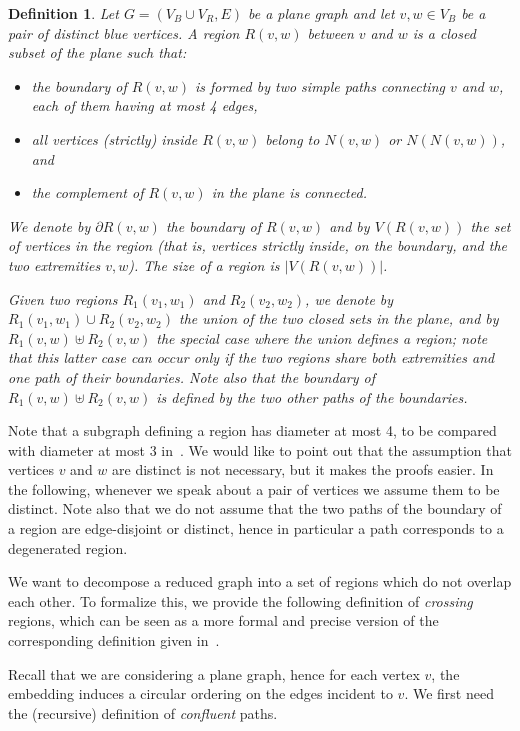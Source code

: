 \documentclass[a4paper,11pt]{article}
\newtheorem{defi} {Definition}
\begin{document}
\begin{defi}\label{def:region}
Let $G = (V_B \cup V_R,E) $ be a plane graph and let $v,w \in V_B$ be a pair of distinct blue vertices.
A \emph{region} $R(v,w)$ between $v$ and $w$ is a closed subset of the plane such that:
\begin{itemize}\itemsep0em
  \item the boundary of $R(v,w)$ is formed by two simple paths connecting $v$ and $w$, each of them having at most 4 edges,
  \item all vertices (strictly) inside $R(v,w)$ belong to $N(v,w)$ or $N(N(v,w))$, and
  \item the complement of $R(v,w)$ in the plane is connected.
\end{itemize}

We denote by $\partial R(v,w)$ the boundary of $R(v,w)$ and by $V(R(v,w))$ the set of vertices in the region (that is, vertices strictly inside, on the boundary, and the two extremities $v,w$). The \emph{size} of a region is $|V(R(v,w))|$.


Given two regions $R_1(v_1,w_1)$ and $R_2(v_2,w_2)$, we denote by $R_1(v_1,w_1) \cup R_2(v_2,w_2)$  the union of the two closed sets in the plane, and by $R_1(v,w) \uplus R_2(v,w)$ the special case where the union defines a region; note that this latter case can occur only if the two regions share both extremities and one path of their boundaries. Note also that the boundary of $R_1(v,w) \uplus R_2(v,w)$ is defined by the two other paths of the boundaries.
\end{defi}

Note that a subgraph defining a region has diameter at most 4, to be compared with diameter at most 3 in~\cite{AFN04}. We would like to point out that the assumption that vertices $v$ and $w$ are distinct is not necessary, but it makes the proofs easier. In the following, whenever we speak about a pair of vertices we assume them to be  distinct. Note also that we do not assume that the two paths of the boundary of a region are edge-disjoint or distinct, hence in particular a path corresponds to a degenerated region.

We want to decompose a reduced graph into a set of regions which do not overlap each other. To formalize this, we provide the following definition of \emph{crossing} regions, which can be seen as a more formal and precise version of the corresponding definition given in~\cite{AFN04}.

Recall that we are considering a plane graph, hence for each vertex $v$, the embedding induces a circular ordering on the edges incident to $v$. We first need the (recursive) definition of \emph{confluent} paths.
\end{document}
